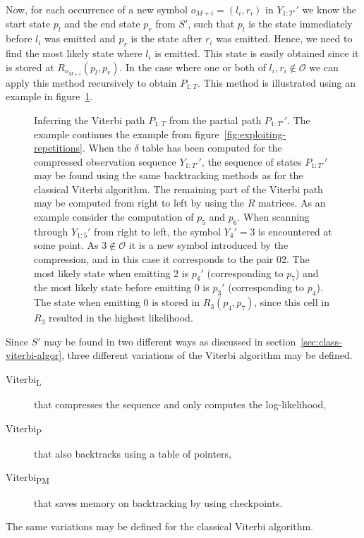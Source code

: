 Now, for each occurrence of a new symbol $o_{M + i} = (l_i, r_i)$ in $Y_{1:T'}'$
we know the start state $p_l$ and the end state $p_r$ from $S'$, such that
$p_l$ is the state immediately before $l_i$ was emitted and $p_r$ is the state
after $r_i$ was emitted. Hence, we need to find the most likely state where
$l_i$ is emitted. This state is easily obtained since it is stored at
$R_{o_{M + i}}(p_l, p_r)$. In the case where one or both of
$l_i, r_i \not \in \mathcal{O}$ we can apply this method recursively to obtain
$P_{1:T}$. This method is illustrated using an example in
figure~\ref{fig:infering-viterbi-path}.

\begin{figure}
  \centering
  
  \caption{Inferring the Viterbi path $P_{1:T}$ from the partial path
    $P_{1:T'}'$. The example continues the example from
    figure~\ref{fig:exploiting-repetitions}. When the $\delta$ table has been
    computed for the compressed observation sequence $Y_{1:T'}'$, the sequence
    of states $P_{1:T'}'$ may be found using the same backtracking methods as
    for the classical Viterbi algorithm. The remaining part of the Viterbi path
    may be computed from right to left by using the $R$ matrices. As an example
    consider the computation of $p_5$ and $p_6$. When scanning through
    $Y_{1:5}'$ from right to left, the symbol $Y_4' = 3$ is encountered at some
    point. As $3 \not \in \mathcal{O}$ it is a new symbol introduced by the
    compression, and in this case it corresponds to the pair $02$. The most
    likely state when emitting 2 is $p_4'$ (corresponding to $p_7$) and the
    most likely state before emitting 0 is $p_3'$ (corresponding to $p_4$). The
    state when emitting 0 is stored in $R_3(p_4, p_7)$, since this cell in
    $R_3$ resulted in the highest likelihood.}
  \label{fig:infering-viterbi-path}
\end{figure}

Since $S'$ may be found in two different ways as discussed in
section~\ref{sec:class-viterbi-algor}, three different variations of the Viterbi
algorithm may be defined.
\begin{description}
\item[Viterbi\textsubscript{L}] that compresses the sequence and only computes the
  log-likelihood,
\item[Viterbi\textsubscript{P}] that also backtracks using a table of pointers,
\item[Viterbi\textsubscript{PM}] that saves memory on backtracking by using checkpoints.
\end{description}
The same variations may be defined for the classical Viterbi algorithm.


